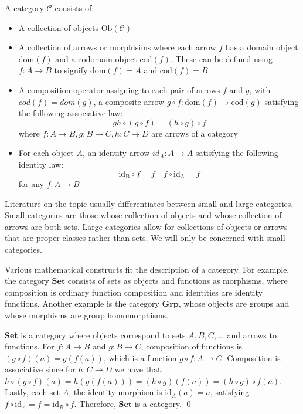 \begin{definition} A category $\mathcal{C}$ consists of:
  \begin{itemize}
  \item A collection of objects $\mathrm{Ob}(\mathcal{C})$
  \item A collection of arrows or morphisims where each arrow $f$ has a domain object $\mathrm{dom}(f)$ and a codomain object $\mathrm{cod}(f)$. These can be defined using $f : A \to B $ to signify $\mathrm{dom}(f) = A$ and $\mathrm{cod}(f) = B$
  \item A composition operator assigning to each pair of arrows $f$ and $g$, with $cod(f) = dom(g)$, a composite arrow $g \circ f : \mathrm{dom}(f) \to \mathrm{cod} (g)$ satisfying the following associative law:
    \[
g      h \circ (g \circ f) = (h \circ g) \circ f
    \]
    where $f : A \to B, g : B \to C, h : C \to D$ are arrows of a category
  \item For each object $A$, an identity arrow $id_A : A \to A$ satisfying the following identity law:
    \[
      \mathrm{id_B} \circ f = f \quad f \circ \mathrm{id_A} = f 
    \]
    for any $f : A \to B$
  \end{itemize}
\end{definition}

\begin{remark}
  Literature on the topic usually differentiates between small and large categories. Small categories are those whose collection of objects and whose collection of arrows are both sets. Large categories allow for collections of objects or arrows that are proper classes rather than sets. We will only be concerned with small categories.
\end{remark}

\begin{example}
  Various mathematical constructs fit the description of a category. For example, the category $\mathbf{Set}$ consists of sets as objects and functions as morphisms, where composition is ordinary function composition and identities are identity functions. Another example is the category $\mathbf{Grp}$, whose objects are groups and whose morphisms are group homomorphisms.
\end{example}


\begin{proposition} \textbf{Set} is a category where objects correspond to sets $A,B,C,\dots$ and arrows to functions.
  For $f: A \to B$ and $g: B \to C$, composition of functions is $(g \circ f)(a) = g(f(a))$, which is a function $ g \circ f : A \to C$.
  Composition is associative since for $h: C \to D$ we have that: \( h \circ (g \circ f)(a) = h(g(f(a))) = (h \circ g)(f(a)) = (h \circ g) \circ f(a) \).
  Lastly, each set $A$, the identity morphism is $\mathrm{id}_A(a) = a$, satisfying $f \circ \mathrm{id}_A = f = \mathrm{id}_B \circ f$.
  Therefore, $\mathbf{Set}$ is a category. \qed
\end{proposition}

